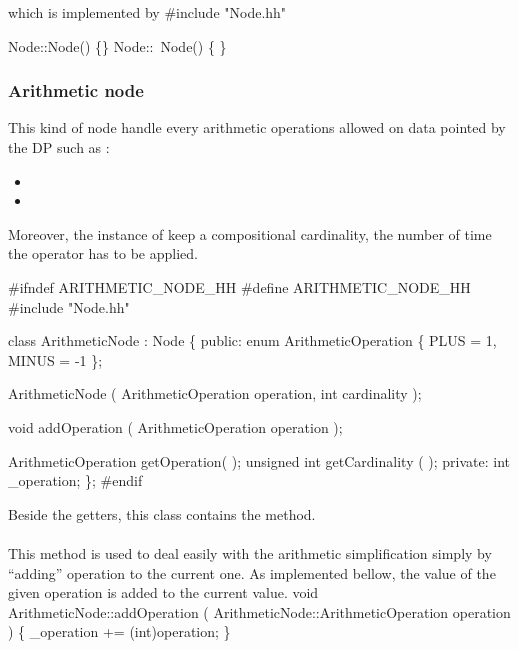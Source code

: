 which is implemented by
\nwenddocs{}\endmoddef\nwstartdeflinemarkup\nwenddeflinemarkup
#include "Node.hh"

Node::Node() \{\}
Node::~Node() \{ \}
\nwendcode{}\nwdocspar

\subsubsection{Arithmetic node}
This kind of node handle every arithmetic operations allowed on data pointed by 
the \gls{DP} such as :
\begin{itemize}
        \item {}
        \item {}
\end{itemize}

Moreover, the instance of  keep a compositional cardinality,
\ie the number of time the operator has to be applied.


\nwenddocs{}\endmoddef\nwstartdeflinemarkup\nwenddeflinemarkup
#ifndef ARITHMETIC_NODE_HH
#define ARITHMETIC_NODE_HH
#include "Node.hh"

class ArithmeticNode : Node \{
        public:
                enum ArithmeticOperation \{ 
                        PLUS    = 1,
                        MINUS   = -1
                \};

                ArithmeticNode ( ArithmeticOperation operation, int cardinality );
                
                void addOperation ( ArithmeticOperation operation );

                ArithmeticOperation getOperation( );
                unsigned int getCardinality ( );
        private:
                int _operation;
\};
#endif
\nwendcode{}\nwdocspar

Beside the getters, this class contains the  method.

\paragraph{}
This method is used to deal easily with the arithmetic simplification simply by ``adding'' operation to the current one. As implemented bellow, the value of the given operation is added to the current value.
\nwenddocs{}\endmoddef\nwstartdeflinemarkup\nwenddeflinemarkup
void ArithmeticNode::addOperation ( ArithmeticNode::ArithmeticOperation operation ) \{
        _operation += (int)operation;
\}
\nwendcode{}\nwdocspar

